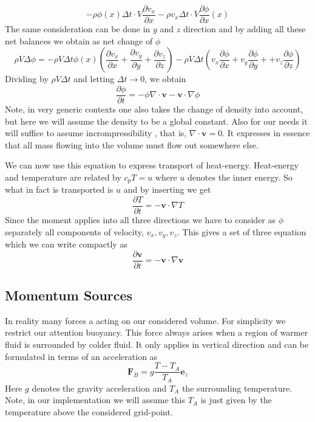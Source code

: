 \documentclass[]{article}
\begin{document}
\begin{equation*}
-\rho \phi(x)\Delta t\cdot V\frac{\partial v_x}{\partial x}
-\rho v_x\Delta t\cdot V \frac{\partial \phi}{\partial x}(x)
\end{equation*}
The same consideration can be done in $y$ and $z$ direction and by adding all these net balances we obtain as net change of $\phi$
\begin{equation*}
\rho V \Delta \phi =
-\rho V \Delta t\phi(x)\left(\frac{\partial v_x}{\partial x} 
+\frac{\partial v_y}{\partial y}+\frac{\partial v_z}{\partial z}\right)
 -\rho V \Delta t \left(v_x \frac{\partial \phi}{\partial x}+
 v_y \frac{\partial \phi}{\partial y}+
 +v_z \frac{\partial \phi}{\partial z}\right)
\end{equation*}
Dividing by $\rho V \Delta t$ and letting $\Delta t\rightarrow 0$, we obtain
\begin{equation} \label{transp_equation}
\frac{\partial\phi}{\partial t}=-\phi\nabla\cdot\textbf{v} -\textbf{v}\cdot\nabla\phi
\end{equation}
Note, in very generic contexts one also takes the change of density into account, but here we will assume the density to be a global constant.
Also for our needs it will suffice to assume incrompressibility , that is, $\nabla\cdot\textbf{v}=0$. It expresses in essence that all mass flowing into the volume must flow out somewhere else.

We can now use this equation to express transport of heat-energy. Heat-energy and temperature are 
related by $c_p T=u$ where $u$ denotes the inner energy. So what in fact is transported is $u$ and by inserting we get
\begin{equation} \label{transp_heat}
\frac{\partial T}{\partial t}=-\textbf{v}\cdot\nabla T
\end{equation}
Since the moment applies into all three directions we have to consider as $\phi$ separately all components of velocity, $v_x, v_y, v_z$. This gives a set of three equation which we can write compactly as
\begin{equation}
\frac{\partial\textbf{v}}{\partial t}=-\textbf{v}\cdot\nabla\textbf{v}
\end{equation}

\subsection{Momentum Sources}
In reality many forces a acting on our considered volume. For simplicity we restrict our attention buoyancy. This force always arises when
a region of warmer fluid is surrounded by colder fluid. It only applies in vertical direction and
can be formulated in terms of an acceleration as
\begin{equation}
\textbf{F}_{B}=g\frac{T-T_{A}}{T_{A}}\textbf{e}_{z}
\end{equation}
Here $g$ denotes the gravity acceleration and $T_A$ the surrounding temperature.
Note, in our implementation we will assume this $T_A$ is just given by the temperature above
the considered grid-point.
\end{document}
